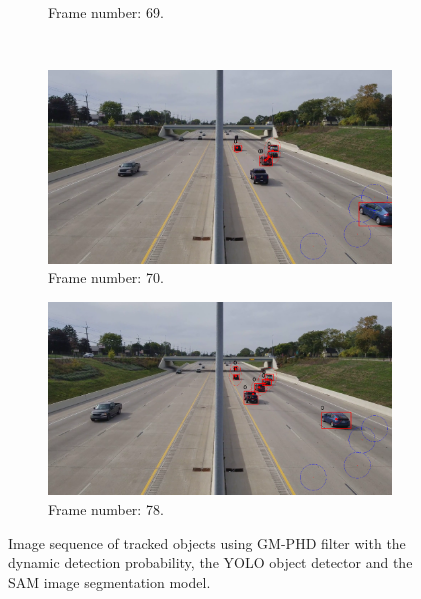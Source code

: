 \begin{figure}[H]
\begin{subfigure}{0.48\textwidth}
        \caption{Frame number: 69.}
        \label{fig:E1-V1-S2:06}
    \end{subfigure}
    \\
    \begin{subfigure}{0.48\textwidth}
        \centering
        \includegraphics[width=\linewidth]{../../../experiments/E1/V1/SAM/70}
        \caption{Frame number: 70.}
        \label{fig:E1-V1-S2:07}
    \end{subfigure}
    \begin{subfigure}{0.48\textwidth}
        \centering
        \includegraphics[width=\linewidth]{../../../experiments/E1/V1/SAM/78}
        \caption{Frame number: 78.}
        \label{fig:E1-V1-S2:08}
    \end{subfigure}
    \caption{Image sequence of tracked objects using GM-PHD filter with the dynamic detection probability, the YOLO
    object detector and the SAM image segmentation model.}
    \label{fig:E1-V1-S2}
\end{figure}


